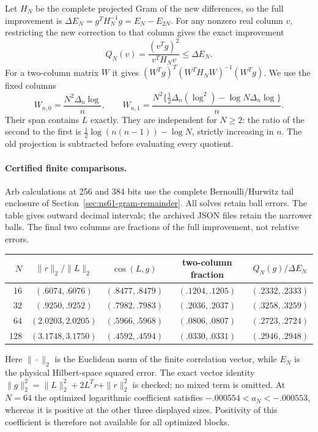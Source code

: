 Let $H_N$ be the complete projected Gram of the new differences, so
the full improvement is $\Delta E_N=g^T H_N^{-1}g=E_N-E_{2N}$.
For any nonzero real column $v$, restricting the new correction to
that column gives the exact improvement
\begin{equation}
 Q_N(v)=\frac{(v^Tg)^2}{v^TH_Nv}\leq\Delta E_N.
 \label{eq:ns69-selected-gain}
\end{equation}
For a two-column matrix $W$ it gives
$(W^Tg)^T(W^TH_NW)^{-1}(W^Tg)$. We use the fixed columns
\[
 W_{n,0}=\frac{N^2\Delta_n\log}{n},\qquad
 W_{n,1}=\frac{N^2\{\tfrac12\Delta_n(\log^2)
                                      -\log N\Delta_n\log\}}{n}.
\]
Their span contains $L$ exactly. They are independent for $N\geq2$:
the ratio of the second to the first is
$\tfrac12\log(n(n-1))-\log N$, strictly increasing in $n$.
The old projection is subtracted before evaluating every quotient.

\paragraph{Certified finite comparisons.}
Arb calculations at 256 and 384 bits use the complete Bernoulli/Hurwitz
tail enclosure of Section~\ref{sec:ns61-gram-remainder}. All solves
retain ball errors. The table gives outward decimal intervals; the
archived JSON files retain the narrower balls. The final two columns
are fractions of the full improvement, not relative errors.
\begin{center}\small
\begin{tabular}{rcccc}
\toprule
$N$ & $\|r\|_2/\|L\|_2$ & $\cos(L,g)$ & two-column fraction
 & $Q_N(g)/\Delta E_N$\\
\midrule
16 & $(.6074,.6076)$ & $(.8477,.8479)$ & $(.1204,.1205)$ & $(.2332,.2333)$\\
32 & $(.9250,.9252)$ & $(.7982,.7983)$ & $(.2036,.2037)$ & $(.3258,.3259)$\\
64 & $(2.0203,2.0205)$ & $(.5966,.5968)$ & $(.0806,.0807)$ & $(.2723,.2724)$\\
128 & $(3.1748,3.1750)$ & $(.4592,.4594)$ & $(.0330,.0331)$ & $(.2946,.2948)$\\
\bottomrule
\end{tabular}\end{center}
Here $\|\cdot\|_2$ is the Euclidean norm of the finite correlation
vector, while $E_N$ is the physical Hilbert-space squared error.
The exact vector identity
$\|g\|_2^2=\|L\|_2^2+2L^Tr+\|r\|_2^2$ is checked;
no mixed term is omitted. At $N=64$ the optimized logarithmic
coefficient satisfies
$-.000554<a_N<-.000553$, whereas it is positive at the other
three displayed sizes. Positivity of this coefficient is therefore
not available for all optimized blocks.

